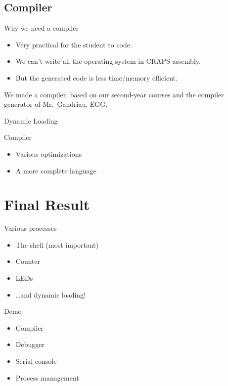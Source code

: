 \documentclass{beamer}
\begin{document}
    \subsection{Compiler}
      \begin{frame}{Why we need a compiler}

        \begin{itemize}
          \item Very practical for the student to code.
          \item We can't write all the operating system in CRAPS assembly.
          \item But the generated code is less time/memory efficient.
        \end{itemize}

        We made a compiler, based on our second-year courses and the compiler
        generator of Mr.\ Gandriau, EGG.
      \end{frame}

      \begin{frame}{Dynamic Loading}
      \end{frame}

      \begin{frame}{Compiler}
        \begin{itemize}
          \item Various optimizations
          \item A more complete language
        \end{itemize}
      \end{frame}

  \section{Final Result}
    \begin{frame}{Various processes}
      \begin{itemize}
        \item The shell (most important)
        \item Counter
        \item LEDs
        \item \dots and dynamic loading!
      \end{itemize}
    \end{frame}

    \begin{frame}{Demo}
      \begin{itemize}
        \item Compiler
        \item Debugger
        \item Serial console
        \item Process management
      \end{itemize}
    \end{frame}
\end{document}
